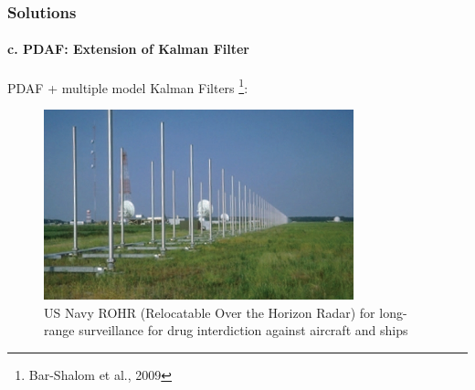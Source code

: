 \documentclass{beamer}
\begin{document}
%
%
%
%
%
%
%
%



\begin{frame}
\frametitle{Solutions}
\framesubtitle{c. PDAF: Extension of Kalman Filter}
\mypagenum
	PDAF + multiple model Kalman Filters \tiny{\footnote{Bar-Shalom et al., 2009}}:
	\begin{figure}
		\includegraphics[width=0.8\textwidth]{figs/TRK_PDAF_example_US_Navy_ROTHR.jpg}
		\caption {US Navy ROHR (Relocatable Over the Horizon Radar) for long-range surveillance for drug interdiction against aircraft and ships}
	\end{figure}
\end{frame}
\end{document}
